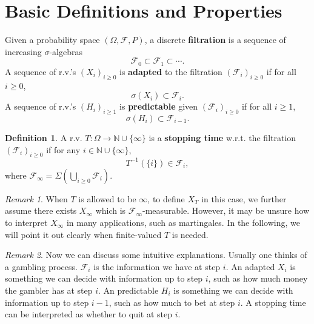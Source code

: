\documentclass[openany]{book}
\theoremstyle{definition}
\newtheorem{definition}{Definition}[chapter]
\theoremstyle{remark}
\newtheorem*{remark}{Remark}
\begin{document}
\section{Basic Definitions and Properties}
Given a probability space $(\Omega,\mathcal{F},P)$, a discrete \textbf{filtration} is a sequence of increasing $\sigma$-algebras
\begin{equation*}
    \mathcal{F}_0\subset \mathcal{F}_1\subset\cdots.
\end{equation*}
A sequence of r.v.'s $(X_i)_{i\ge0}$ is \textbf{adapted} to the filtration $(\mathcal{F}_i)_{i\ge0}$ if for all $i\ge0$,
\begin{equation*}
    \sigma(X_i)\subset \mathcal{F}_i.
\end{equation*}
A sequence of r.v.'s $(H_i)_{i\ge1}$ is \textbf{predictable} given $(\mathcal{F}_i)_{i\ge0}$ if for all $i\ge1$,
\begin{equation*}
    \sigma(H_i)\subset \mathcal{F}_{i-1}.
\end{equation*}
\begin{definition}
    A r.v. $T:\Omega\to \mathbb{N}\cup\{\infty\}$ is a \textbf{stopping time} w.r.t. the filtration $(\mathcal{F}_i)_{i\ge0}$ if for any $i\in \mathbb{N}\cup\{\infty\}$,
    \begin{equation*}
        T^{-1}\left(\{i\}\right)\in \mathcal{F}_i,
    \end{equation*}
    where $\mathcal{F}_{\infty}=\Sigma\left(\bigcup_{i\ge0}\mathcal{F}_i\right)$.
\end{definition}
\begin{remark}
    When $T$ is allowed to be $\infty$, to define $X_T$ in this case, we further assume there exists $X_{\infty}$ which is $\mathcal{F}_{\infty}$-measurable. However, it may be unsure how to interpret $X_{\infty}$ in many applications, such as martingales. In the following, we will point it out clearly when finite-valued $T$ is needed.
\end{remark}
\begin{remark}
    Now we can discuss some intuitive explanations. Usually one thinks of a gambling process. $\mathcal{F}_i$ is the information we have at step $i$. An adapted $X_i$ is something we can decide with information up to step $i$, such as how much money the gambler has at step $i$. An predictable $H_i$ is something we can decide with information up to step $i-1$, such as how much to bet at step $i$. A stopping time can be interpreted as whether to quit at step $i$.
\end{remark}
\end{document}
